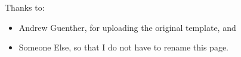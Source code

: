 
\begin{acknowledgments}

 

    Thanks to:
    \begin{itemize}
        \item Andrew Guenther, for uploading the original template, and
        \item Someone Else, so that I do not have to rename this page.
    \end{itemize}
\end{acknowledgments}
